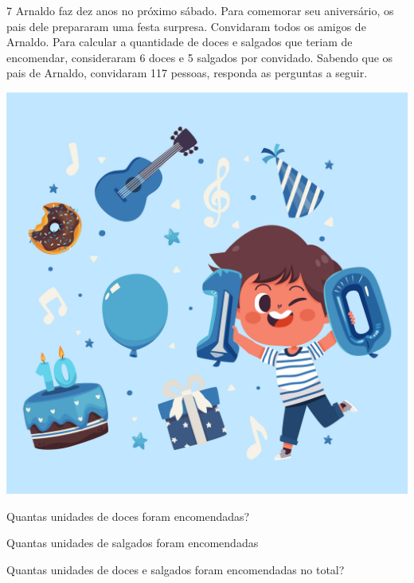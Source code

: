 
\num{7} Arnaldo faz dez anos no próximo sábado. Para comemorar seu 
aniversário, os pais dele prepararam uma festa surpresa.
Convidaram todos os amigos de Arnaldo. Para calcular a quantidade 
de doces e salgados que teriam de encomendar, consideraram 6 doces e 
5 salgados por convidado. Sabendo que os pais de Arnaldo,
convidaram 117 pessoas, responda as perguntas a seguir.

\begin{center}
\includegraphics[width=.5\textwidth]{media/image14d.jpeg}
\end{center}

\begin{escolha}
\item Quantas unidades de doces foram encomendadas?

\item Quantas unidades de salgados foram encomendadas

\item Quantas unidades de doces e salgados foram encomendadas no total?
\end{escolha}


